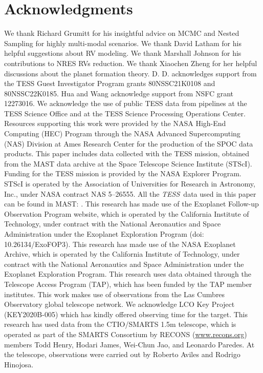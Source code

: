 \documentclass[twocolumn]{aastex631}
\newcommand{\tess}{\textit{TESS}\ }
\begin{document}
\section{Acknowledgments}
We thank Richard Grumitt for his insightful advice on MCMC and Nested Sampling for highly multi-modal scenarios. 
We thank David Latham for his helpful suggestions about RV modeling. 
We thank Marshall Johnson for his contributions to NRES RVs reduction.
We thank Xiaochen Zheng for her helpful discussions about the planet formation theory.
D. D. acknowledges support from the TESS Guest Investigator Program grants 80NSSC21K0108 and 80NSSC22K0185.
Hua and Wang acknowledge support from NSFC grant 12273016.
We acknowledge the use of public TESS data from pipelines at the TESS Science Office and at the TESS Science Processing Operations Center.
Resources supporting this work were provided by the NASA High-End Computing (HEC) Program through the NASA Advanced Supercomputing (NAS) Division at Ames Research Center for the production of the SPOC data products.
This paper includes data collected with the TESS mission, obtained from the MAST data archive at the Space Telescope Science Institute (STScI). Funding for the TESS mission is provided by the NASA Explorer Program. STScI is operated by the Association of Universities for Research in Astronomy, Inc., under NASA contract NAS 5–26555.
All the \tess data used in this paper can be found in MAST: . 
This research has made use of the Exoplanet Follow-up Observation Program website, which is operated by the California Institute of Technology, under contract with the National Aeronautics and Space Administration under the Exoplanet Exploration Program (doi: 10.26134/ExoFOP3).
This research has made use of the NASA Exoplanet Archive, which is operated by the California Institute of Technology, under contract with the National Aeronautics and Space Administration under the Exoplanet Exploration Program.
This research uses data obtained through the Telescope Access Program (TAP), which has been funded by the TAP member institutes.
This work makes use of observations from the Las Cumbres Observatory global telescope network.
We acknowledge LCO Key Project (KEY2020B-005) which has kindly offered observing time for the target.  
This research has used data from the CTIO/SMARTS 1.5m telescope, which is operated as part of the SMARTS Consortium by RECONS (\url{www.recons.org}) members Todd Henry, Hodari James, Wei-Chun Jao, and Leonardo Paredes. At the telescope, observations were carried out by Roberto Aviles and Rodrigo Hinojosa.
\end{document}

